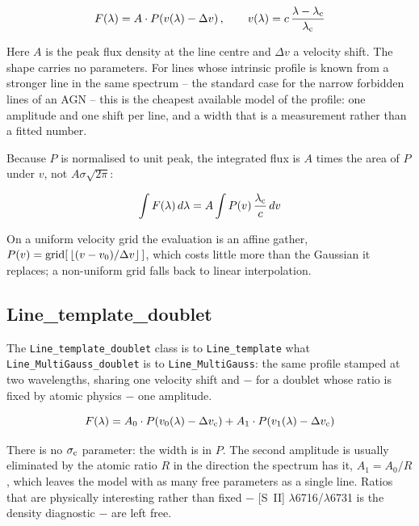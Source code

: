 \documentclass[11pt]{article}
\begin{document}
\begin{equation}
F(\lambda) = A \cdot P\!\left(v(\lambda) - \Delta v\right),
\qquad v(\lambda) = c\,\frac{\lambda - \lambda_{\rm c}}{\lambda_{\rm c}}
\end{equation}

Here $A$ is the peak flux density at the line centre and $\Delta v$ a velocity
shift. The shape carries no parameters. For lines whose intrinsic profile is known
from a stronger line in the same spectrum -- the standard case for the narrow
forbidden lines of an AGN -- this is the cheapest available model of the profile:
one amplitude and one shift per line, and a width that is a measurement rather
than a fitted number.

Because $P$ is normalised to unit peak, the integrated flux is $A$ times the area
of $P$ under $v$, not $A\sigma\sqrt{2\pi}$:

\begin{equation}
\int F(\lambda)\, d\lambda = A \int P(v)\, \frac{\lambda_{\rm c}}{c}\, dv
\end{equation}

On a uniform velocity grid the evaluation is an affine gather,
$P(v) = {\rm grid}[\,\lfloor (v - v_0)/\Delta v \rfloor\,]$, which costs little more
than the Gaussian it replaces; a non-uniform grid falls back to linear
interpolation.

\subsection{Line\_template\_doublet}

The \texttt{Line\_template\_doublet} class is to \texttt{Line\_template} what
\texttt{Line\_MultiGauss\_doublet} is to \texttt{Line\_MultiGauss}: the same
profile stamped at two wavelengths, sharing one velocity shift and $-$ for a
doublet whose ratio is fixed by atomic physics $-$ one amplitude.

\begin{equation}
F(\lambda) = A_0 \cdot P\!\left(v_0(\lambda) - \Delta v_{\rm c}\right)
           + A_1 \cdot P\!\left(v_1(\lambda) - \Delta v_{\rm c}\right)
\end{equation}

There is no $\sigma_{\rm c}$ parameter: the width is in $P$. The second amplitude
is usually eliminated by the atomic ratio $R$ in the direction the spectrum has it,
$A_1 = A_0 / R$, which leaves the model with as many free parameters as a single
line. Ratios that are physically interesting rather than fixed $-$ [S~II]
$\lambda$6716/$\lambda$6731 is the density diagnostic $-$ are left free.
\end{document}
